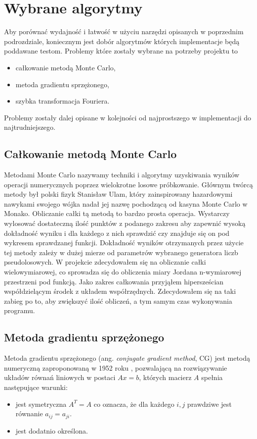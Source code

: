 \documentclass[a4paper,12pt]{book} %
\begin{document}
\section{Wybrane algorytmy}
Aby porównać wydajność i łatwość w użyciu narzędzi opisanych w poprzednim podrozdziale, koniecznym jest dobór algorytmów których implementacje będą poddawane testom. Problemy które zostały wybrane na potrzeby projektu to
\begin{itemize}
\item całkowanie metodą Monte Carlo,
\item metoda gradientu sprzężonego,
\item szybka transformacja Fouriera.
\end{itemize}
Problemy zostały dalej opisane w kolejności od najprostszego w implementacji do najtrudniejszego.
\subsection{Całkowanie metodą Monte Carlo}
Metodami Monte Carlo nazywamy techniki i algorytmy uzyskiwania wyników operacji numerycznych poprzez wielokrotne losowe próbkowanie. Głównym twórcą metody był polski fizyk Stanisław Ulam, który zainspirowany hazardowymi nawykami swojego wójka nadał jej nazwę pochodzącą od kasyna Monte Carlo w Monako.\cite{mc_beggining}
Obliczanie całki tą metodą to bardzo prosta operacja. Wystarczy wylosować dostateczną ilość punktów z podanego zakresu aby zapewnić wysoką dokładność wyniku i dla każdego z nich sprawdzić czy znajduje się on pod wykresem sprawdzanej funkcji. Dokładność wyników otrzymanych przez użycie tej metody zależy w dużej mierze od parametrów wybranego generatora liczb pseudolosowych.
W projekcie zdecydowałem się na obliczanie całki wielowymiarowej, co sprowadza się do obliczenia miary Jordana\cite{miara-jordana} n-wymiarowej przestrzeni pod funkcją. Jako zakres całkowania przyjąłem hipersześcian współdzielącym środek z układem współrzędnych. Zdecydowałem się na taki zabieg po to, aby zwiększyć ilość obliczeń, a tym samym czas wykonywania programu.
\subsection{Metoda gradientu sprzężonego}
Metoda gradientu sprzężonego (ang. \emph{conjugate gradient method}, CG) jest metodą numeryczną zaproponowaną w 1952 roku \cite{conjugate-gradient}, pozwalającą na rozwiązywanie układów równań liniowych w postaci $Ax = b$, których macierz $A$ spełnia następujące warunki:
\begin{itemize}
\item jest symetryczna $A^T=A$ co oznacza, że dla każdego $i, j$ prawdziwe jest równanie $a_{ij} = a_{ji}.$
\item jest dodatnio określona.
\end{itemize}
\end{document}
